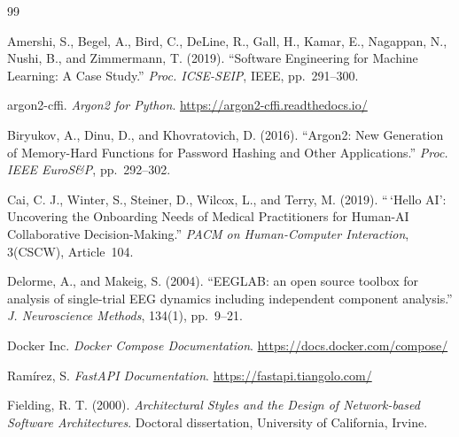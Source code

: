 \documentclass[11pt,a4paper]{article}
\begin{document}
{\footnotesize
\let\qsfeoldsection\section
\renewcommand{\section}[2]{}
\begin{thebibliography}{99}\setlength{\itemsep}{2pt}

 Amershi, S., Begel, A., Bird, C., DeLine, R., Gall, H., Kamar, E., Nagappan, N., Nushi, B., and Zimmermann, T. (2019). ``Software Engineering for Machine Learning: A Case Study.'' \emph{Proc. ICSE-SEIP}, IEEE, pp.~291--300.

 argon2-cffi. \emph{Argon2 for Python}. \url{https://argon2-cffi.readthedocs.io/}

 Biryukov, A., Dinu, D., and Khovratovich, D. (2016). ``Argon2: New Generation of Memory-Hard Functions for Password Hashing and Other Applications.'' \emph{Proc. IEEE EuroS\&P}, pp.~292--302.

 Cai, C. J., Winter, S., Steiner, D., Wilcox, L., and Terry, M. (2019). ``\,`Hello AI': Uncovering the Onboarding Needs of Medical Practitioners for Human-AI Collaborative Decision-Making.'' \emph{PACM on Human-Computer Interaction}, 3(CSCW), Article~104.

 Delorme, A., and Makeig, S. (2004). ``EEGLAB: an open source toolbox for analysis of single-trial EEG dynamics including independent component analysis.'' \emph{J. Neuroscience Methods}, 134(1), pp.~9--21.

 Docker Inc. \emph{Docker Compose Documentation}. \url{https://docs.docker.com/compose/}

 Ram\'irez, S. \emph{FastAPI Documentation}. \url{https://fastapi.tiangolo.com/}

 Fielding, R. T. (2000). \emph{Architectural Styles and the Design of Network-based Software Architectures}. Doctoral dissertation, University of California, Irvine.


\end{thebibliography}}
\end{document}
